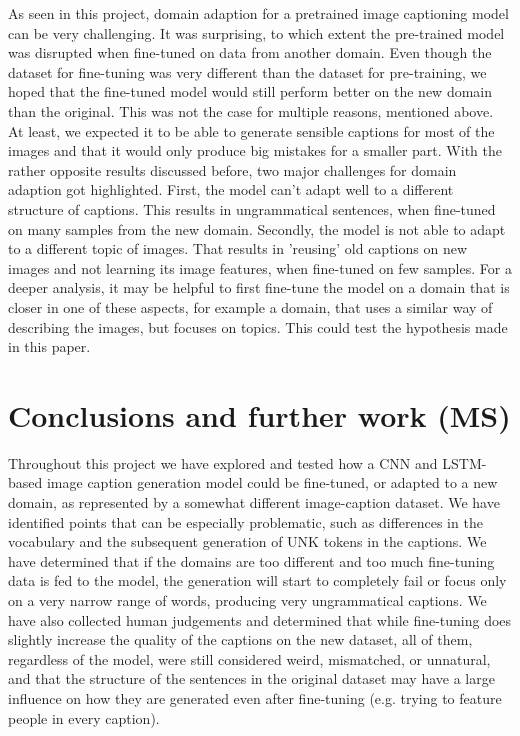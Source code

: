 \documentclass[11pt]{article}
\begin{document}
As seen in this project, domain adaption for a pretrained image captioning model can be very challenging. It was surprising, to which extent the pre-trained model was disrupted when fine-tuned on data from another domain. Even though the dataset for fine-tuning was very different than the dataset for pre-training, we hoped that the fine-tuned model would still perform better on the new domain than the original. This was not the case for multiple reasons, mentioned above. At least, we expected it to be able to generate sensible captions for most of the images and that it would only produce big mistakes for a smaller part. With the rather opposite results discussed before, two major challenges for domain adaption got highlighted. First, the model can't adapt well to a different structure of captions. This results in ungrammatical sentences, when fine-tuned on many samples from the new domain. Secondly, the model is not able to adapt to a different topic of images. That results in 'reusing' old captions on new images and not learning its image features, when fine-tuned on few samples. For a deeper analysis, it may be helpful to first fine-tune the model on a domain that is closer in one of these aspects, for example a domain, that uses a similar way of describing the images, but focuses on topics. This could test the hypothesis made in this paper.

\section{Conclusions and further work (MS)}

Throughout this project we have explored and tested how a CNN and LSTM-based image caption generation model could be fine-tuned, or adapted to a new domain, as represented by a somewhat different image-caption dataset. We have identified points that can be especially problematic, such as differences in the vocabulary and the subsequent generation of UNK tokens in the captions. We have determined that if the domains are too different and too much fine-tuning data is fed to the model, the generation will start to completely fail or focus only on a very narrow range of words, producing very ungrammatical captions. We have also collected human judgements and determined that while fine-tuning does slightly increase the quality of the captions on the new dataset, all of them, regardless of the model, were still considered weird, mismatched, or unnatural, and that the structure of the sentences in the original dataset may have a large influence on how they are generated even after fine-tuning (e.g. trying to feature people in every caption).
\end{document}
